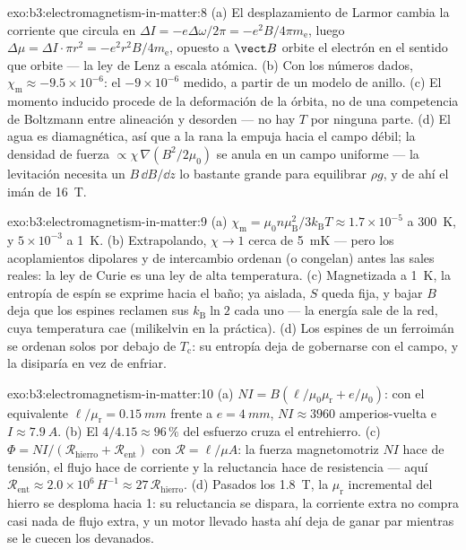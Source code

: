 \begin{solution}{exo:b3:electromagnetism-in-matter:8}
(a) El desplazamiento de Larmor cambia la corriente que circula en $\Delta I
= -e\Delta\omega/2\pi = -e^2B/4\pi m_{\text{e}}$, luego
$\Delta\mu = \Delta I\cdot\pi r^2 = -e^2r^2B/4m_{\text{e}}$,
opuesto a $\vect B$ orbite el electrón en el sentido que orbite ---
la ley de Lenz a escala atómica. (b) Con los números dados,
$\chi_{\text{m}} \approx -9.5\times10^{-6}$: el
$-9\times10^{-6}$ medido, a partir de un modelo de anillo. (c) El momento inducido
procede de la deformación de la órbita, no de una competencia de Boltzmann
entre alineación y desorden --- no hay $T$ por ninguna parte. (d) El agua es
diamagnética, así que a la rana la empuja hacia el campo débil; la densidad
de fuerza $\propto \chi\,\nabla(B^2/2\mu_0)$ se anula en un campo
uniforme --- la levitación necesita un $B\,\dd B/\dd z$ lo bastante grande para
equilibrar $\rho g$, y de ahí el imán de \qty{16}{T}.
\end{solution}

\begin{solution}{exo:b3:electromagnetism-in-matter:9}
(a) $\chi_{\text{m}} = \mu_0n\mu_{\text{B}}^2/3k_{\text{B}}T
\approx 1.7\times10^{-5}$ a \qty{300}{K}, y $5\times10^{-3}$ a
\qty{1}{K}. (b) Extrapolando, $\chi \to 1$ cerca de \qty{5}{mK} ---
pero los acoplamientos dipolares y de intercambio ordenan (o congelan) antes
las sales reales: la ley de Curie es una ley de alta temperatura. (c) Magnetizada a
\qty{1}{K}, la entropía de espín se exprime hacia el baño;
ya aislada, $S$ queda fija, y bajar $B$ deja que los espines reclamen
sus $k_{\text{B}}\ln 2$ cada uno --- la energía sale de la
red, cuya temperatura cae (milikelvin en la práctica). (d)
Los espines de un ferroimán se ordenan solos por debajo de $T_{\text{c}}$: su
entropía deja de gobernarse con el campo, y la 
disiparía en vez de enfriar.
\end{solution}

\begin{solution}{exo:b3:electromagnetism-in-matter:10}
(a) $NI = B(\ell/\mu_0\mu_{\text{r}} + e/\mu_0)$: con el
equivalente $\ell/\mu_{\text{r}} = \qty{0.15}{mm}$ frente a $e =
\qty{4}{mm}$, $NI \approx 3960$ amperios-vuelta e $I \approx
\qty{7.9}{A}$. (b) El $4/4.15 \approx 96\,\%$ del esfuerzo cruza
el entrehierro. (c) $\Phi = NI/(\mathcal R_{\text{hierro}} +
\mathcal R_{\text{ent}})$ con $\mathcal R = \ell/\mu A$:
la fuerza magnetomotriz $NI$ hace de tensión, el flujo hace de corriente y
la reluctancia hace de resistencia --- aquí $\mathcal R_{\text{ent}}
\approx 2.0\times10^{6}\,\unit{H^{-1}} \approx
27\,\mathcal R_{\text{hierro}}$. (d) Pasados los \qty{1.8}{T}, la
$\mu_{\text{r}}$ incremental del hierro se desploma hacia 1: su reluctancia
se dispara, la corriente extra no compra casi nada de flujo extra, y un motor llevado
hasta ahí deja de ganar par mientras se le cuecen los devanados.
\end{solution}

